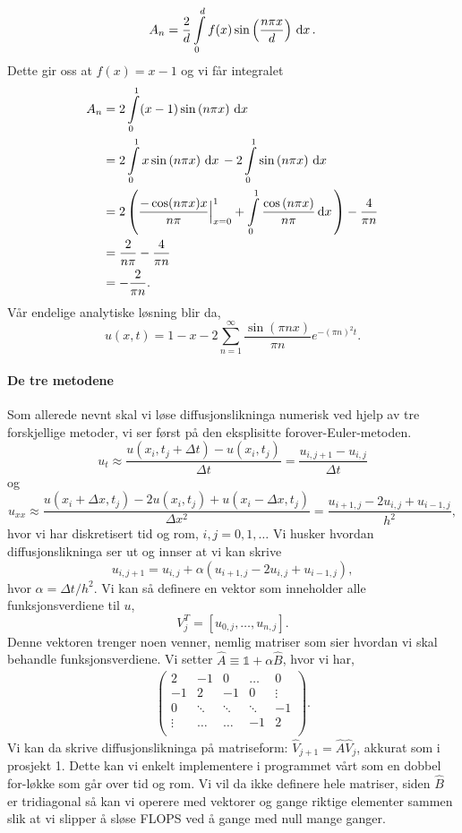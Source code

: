 \documentclass[norsk, 10pt]{article}
\newcommand{\dx}{\, {\rm d}x\, }
\def\para#1{\left( #1 \right)}
\begin{document}
$$ A_n = \frac{2}{d}\int\limits_0^d f(x)\sin\para{\frac{n\pi x}{d}}\dx. $$
Dette gir oss at $f(x) = x - 1$ og vi får integralet
\begin{align*}
A_n 	&= 2\int\limits_0^1 (x-1)\sin\para{n\pi x}\dx \\
	&= 2\int\limits_0^1x\sin\para{n\pi x}\dx - 2\int\limits_0^1\sin\para{n\pi x}\dx \\
	&= 2\para{ \frac{-\cos(n\pi x)x}{n\pi}\Big|_{x=0}^1 + \int\limits_0^1 \frac{\cos\para{n\pi x}}{n\pi}\dx} - \frac{4}{\pi n}\\
	&= \frac{2}{n\pi} - \frac{4}{\pi n} \\
	&= -\frac{2}{\pi n}.
\end{align*}
Vår endelige analytiske løsning blir da,
$$ u(x,t) = 1 - x - 2\sum\limits_{n=1}^{\infty}\frac{\sin\para{\pi nx}}{\pi n}e^{-(\pi n)^2 t}. $$

\paragraph{De tre metodene}
Som allerede nevnt skal vi løse diffusjonslikninga numerisk ved hjelp av tre forskjellige metoder, vi ser først på den eksplisitte forover-Euler-metoden. 
 \[
u_t\approx \frac{u(x_i,t_j+\Delta t)-u(x_i,t_j)}{\Delta t} = \frac{u_{i,j+1}-u_{i,j}}{\Delta t}
\]
og
\[
u_{xx}\approx \frac{u(x_i+\Delta x,t_j)-2u(x_i,t_j)+u(x_i-\Delta x,t_j)}{\Delta x^2} = \frac{u_{i+1,j}-2u_{i,j}+u_{i-1,j}}{h^2},
\]
hvor vi har diskretisert tid og rom, $i,j = 0,1,\ldots$ Vi husker hvordan diffusjonslikninga ser ut og innser at vi kan skrive
\begin{equation} u_{i,j+1} = u_{i,j} + \alpha\para{u_{i+1,j}-2u_{i,j}+u_{i-1,j}},\label{eq:eksplisitt} \end{equation}
hvor $\alpha = \Delta t /h^2$. Vi kan så definere en vektor som inneholder alle funksjonsverdiene til $u$,
$$ V_j^T = [u_{0,j},\ldots,u_{n,j}]. $$
Denne vektoren trenger noen venner, nemlig matriser som sier hvordan vi skal behandle funksjonsverdiene. Vi setter $\hat A \equiv \mathbb 1 + \alpha \hat B$, hvor vi har,
\begin{align}\para{\begin{matrix}
2 & -1 & 0 & \ldots & 0 \\
-1 & 2 & -1 & 0& \vdots \\
0 & \ddots & \ddots & \ddots & -1 \\
\vdots & \ldots & \ldots & -1 & 2 \\
\end{matrix}}.
\end{align}
Vi kan da skrive diffusjonslikninga på matriseform: $\hat V_{j+1} = \hat A \hat V_j$, akkurat som i prosjekt 1. Dette kan vi enkelt implementere i programmet vårt som en dobbel for-løkke som går over tid og rom. Vi vil da ikke definere hele matriser, siden $\hat B$ er tridiagonal så kan vi operere med vektorer og gange riktige elementer sammen slik at vi slipper å sløse FLOPS ved å gange med null mange ganger.
\end{document}
